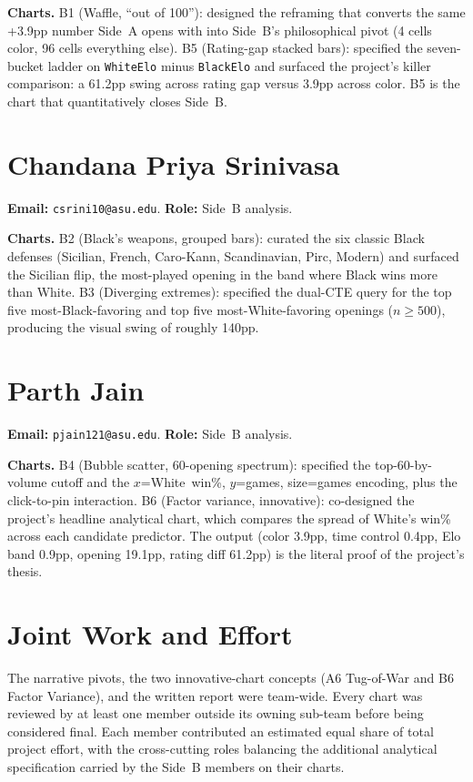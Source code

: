 \documentclass[sigconf,nonacm,natbib=false]{acmart}
\begin{document}
\textbf{Charts.}
B1 (Waffle, ``out of 100''): designed the reframing that converts
the same +3.9pp number Side~A opens with into Side~B's
philosophical pivot (4 cells color, 96 cells everything else).
B5 (Rating-gap stacked bars): specified the seven-bucket ladder on
\texttt{WhiteElo} minus \texttt{BlackElo} and surfaced the project's
killer comparison: a 61.2pp swing across rating gap versus 3.9pp
across color. B5 is the chart that quantitatively closes Side~B.

\section{Chandana Priya Srinivasa}
\textbf{Email:} \texttt{csrini10@asu.edu}.
\textbf{Role:} Side~B analysis.

\textbf{Charts.}
B2 (Black's weapons, grouped bars): curated the six classic Black
defenses (Sicilian, French, Caro-Kann, Scandinavian, Pirc, Modern)
and surfaced the Sicilian flip, the most-played opening in the
band where Black wins more than White.
B3 (Diverging extremes): specified the dual-CTE query for the top
five most-Black-favoring and top five most-White-favoring openings
($n \geq 500$), producing the visual swing of roughly 140pp.

\section{Parth Jain}
\textbf{Email:} \texttt{pjain121@asu.edu}.
\textbf{Role:} Side~B analysis.

\textbf{Charts.}
B4 (Bubble scatter, 60-opening spectrum): specified the
top-60-by-volume cutoff and the $x$=White~win\%, $y$=games,
size=games encoding, plus the click-to-pin interaction.
B6 (Factor variance, innovative): co-designed the project's
headline analytical chart, which compares the spread of White's
win\% across each candidate predictor. The output (color 3.9pp,
time control 0.4pp, Elo band 0.9pp, opening 19.1pp, rating diff
61.2pp) is the literal proof of the project's thesis.

\section{Joint Work and Effort}

The narrative pivots, the two innovative-chart concepts (A6
Tug-of-War and B6 Factor Variance), and the written report were
team-wide. Every chart was reviewed by at least one member outside
its owning sub-team before being considered final. Each member
contributed an estimated equal share of total project effort, with
the cross-cutting roles balancing the additional analytical
specification carried by the Side~B members on their charts.
\end{document}
